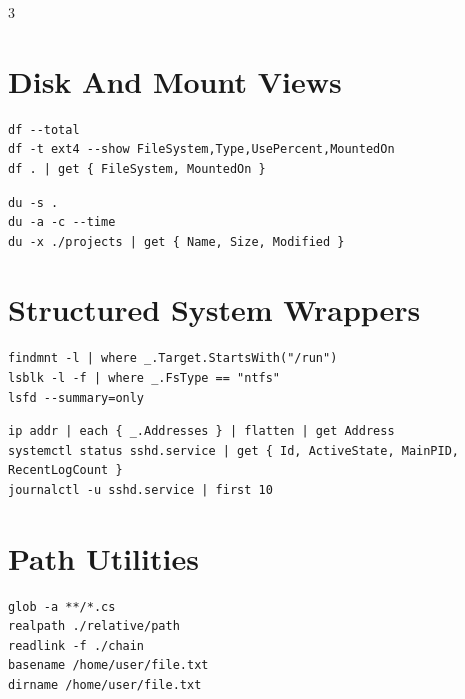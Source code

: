 \begin{multicols*}{3}

\section{Disk And Mount Views}
\begin{lstlisting}
df --total
df -t ext4 --show FileSystem,Type,UsePercent,MountedOn
df . | get { FileSystem, MountedOn }
\end{lstlisting}

\begin{lstlisting}
du -s .
du -a -c --time
du -x ./projects | get { Name, Size, Modified }
\end{lstlisting}


\section{Structured System Wrappers}
\begin{lstlisting}
findmnt -l | where _.Target.StartsWith("/run")
lsblk -l -f | where _.FsType == "ntfs"
lsfd --summary=only
\end{lstlisting}

\begin{lstlisting}
ip addr | each { _.Addresses } | flatten | get Address
systemctl status sshd.service | get { Id, ActiveState, MainPID, RecentLogCount }
journalctl -u sshd.service | first 10
\end{lstlisting}

\columnbreak

\section{Path Utilities}
\begin{lstlisting}
glob -a **/*.cs
realpath ./relative/path
readlink -f ./chain
basename /home/user/file.txt
dirname /home/user/file.txt
\end{lstlisting}



\end{multicols*}
